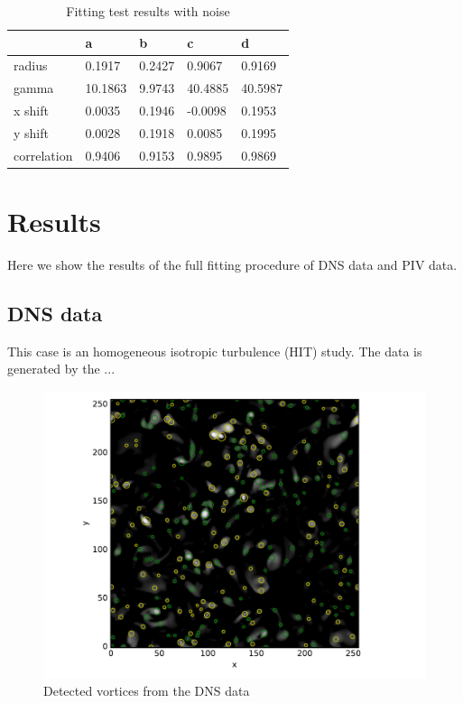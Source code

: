\documentclass[12pt, a4paper, openany]{memoir}
\begin{document}
\begin{table}[h]
	\centering
	\caption{Fitting test results with noise}
	\vspace{10px}
	\label{tb:fittingtestnoise}
	\begin{tabular}{l|l|l|l|l}
		            & a      & b & c & d \\
		\hline
		radius      & 0.1917   & 0.2427 & 0.9067 & 0.9169  \\
		gamma       & 10.1863 & 9.9743 & 40.4885 & 40.5987 \\
		x shift     & 0.0035  & 0.1946 & -0.0098 & 0.1953 \\
		y shift     & 0.0028  & 0.1918 & 0.0085 & 0.1995 \\ 
		correlation & 0.9406   & 0.9153 & 0.9895 & 0.9869 \\
	\end{tabular}
\end{table}


\chapter{Results}
Here we show the results of the full fitting procedure of DNS data and PIV data.

\section{DNS data}
This case is an homogeneous isotropic turbulence (HIT) study. The data is generated by the ...

\begin{figure}[h]
	\centering
	\includegraphics[scale=0.6]{figure/dns_detect.pdf}
	\caption{Detected vortices from the DNS data}
	\label{fig:detectionDNS}
\end{figure}
\end{document}
